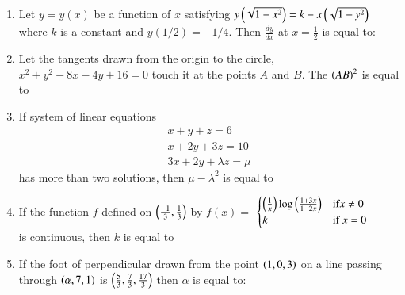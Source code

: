 \documentclass[journal,12pt,onecolumn]{IEEEtran}
\begin{document}
\begin{enumerate}
\item  Let $y = y(x)$ be a function of $x$ satisfying $y\left(\sqrt{1-x^2}\right)=k-x\left(\sqrt{1-y^2}\right)$ where $k$ is a constant and $y(1/2) = -1/4$. Then $\frac{dy}{dx}$ at $x=\frac{1}{2}$ is equal to:
\begin{enumerate}
\end{enumerate}


\item Let the tangents drawn from the origin to the circle, $x^2 + y^2 - 8x - 4y + 16 = 0$ touch it at the points $A$ and $B$. The $\left(AB\right)^2$ is equal to
\begin{enumerate}
\end{enumerate}

\item If system of linear equations \\
\begin{align*}
   x+y+z=6  \\
   x + 2y + 3z = 10 \\
   3x + 2y + \lambda z = \mu
\end{align*}
has more than two solutions, then $\mu - \lambda^2$ is equal to


\item If the function $f$ defined on $\left(\frac{-1}{3},\frac{1}{3}\right)$ by
    $f(x) = $
$\begin{cases}
   \left(\frac{1}{x}\right)\log\left(\frac{1+3x}{1-2x}\right)  & \text{if} x \neq 0\\
    k & \text{if} \  x=0
\end{cases}$\\ 
is continuous, then $k$ is equal to

\item If the foot of perpendicular drawn from the point $\left(1,0,3\right)$ on a line passing through $\left(\alpha,7,1\right)$ is $\left(\frac{5}{3},\frac{7}{3},\frac{17}{3}\right)$ then $\alpha$ is equal to:


\end{enumerate}
\end{document}
